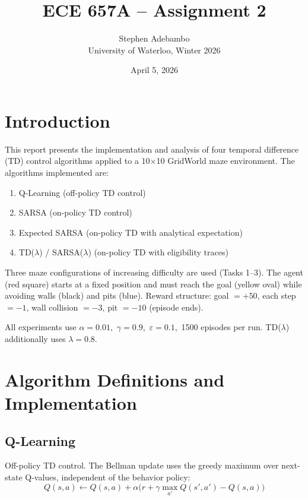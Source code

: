 \documentclass[11pt,letterpaper]{article}
\title{\textbf{ECE 657A -- Assignment 2}}
\author{Stephen Adebambo\\University of Waterloo, Winter 2026}
\date{April 5, 2026}
\begin{document}
\maketitle
\tableofcontents
\newpage

\section{Introduction}

This report presents the implementation and analysis of four temporal difference (TD)
control algorithms applied to a 10$\times$10 GridWorld maze environment.
The algorithms implemented are:
\begin{enumerate}[noitemsep]
  \item Q-Learning (off-policy TD control)
  \item SARSA (on-policy TD control)
  \item Expected SARSA (on-policy TD with analytical expectation)
  \item TD($\lambda$) / SARSA($\lambda$) (on-policy TD with eligibility traces)
\end{enumerate}

Three maze configurations of increasing difficulty are used (Tasks 1--3).
The agent (red square) starts at a fixed position and must reach the goal (yellow oval)
while avoiding walls (black) and pits (blue). Reward structure: goal $= +50$,
each step $= -1$, wall collision $= -3$, pit $= -10$ (episode ends).

All experiments use $\alpha = 0.01$,\ $\gamma = 0.9$,\ $\varepsilon = 0.1$,\
1500 episodes per run. TD($\lambda$) additionally uses $\lambda = 0.8$.

\section{Algorithm Definitions and Implementation}

\subsection{Q-Learning}

Off-policy TD control. The Bellman update uses the greedy maximum over next-state
Q-values, independent of the behavior policy:
\begin{equation}
  Q(s,a) \leftarrow Q(s,a) + \alpha\bigl(r + \gamma\max_{a'}Q(s',a') - Q(s,a)\bigr)
\end{equation}
\end{document}
